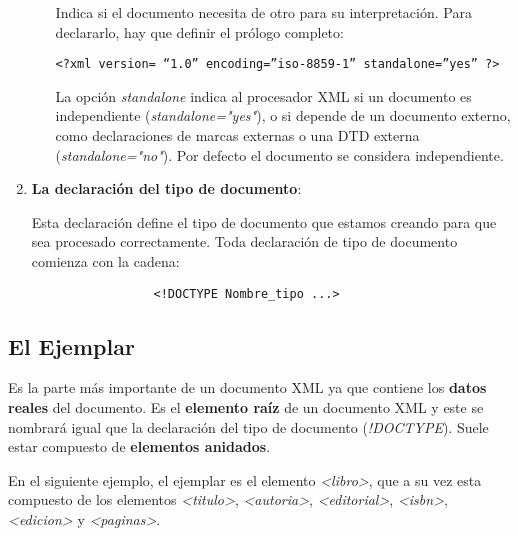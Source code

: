 \begin{enumerate}
\begin{enumerate}
         Indica si el documento necesita de otro para su interpretación. Para declararlo, hay que definir el prólogo completo:
         \begin{tcolorbox}[sharp corners, colback=yellow!40, colframe=white!20]
             \small
             \begin{verbatim}<?xml version= “1.0” encoding=”iso-8859-1” standalone=”yes” ?>\end{verbatim}
         \end{tcolorbox}

         La opción \textit{standalone} indica al procesador XML si un documento es independiente (\textit{standalone="yes"}), o si depende de un documento externo, como declaraciones de marcas externas o una DTD externa (\textit{standalone="no"}). Por defecto el documento se considera independiente.
    \end{enumerate}

    \item \textbf{La declaración del tipo de documento}:

    Esta declaración define el tipo de documento que estamos creando para que sea procesado correctamente. Toda declaración de tipo de documento comienza con la cadena:

    \begin{tcolorbox}[sharp corners, colback=yellow!40, colframe=white!20]
        \begin{verbatim}                 <!DOCTYPE Nombre_tipo ...>\end{verbatim}
    \end{tcolorbox}
\end{enumerate}

\subsection{El Ejemplar}
Es la parte más importante de un documento XML ya que contiene los \textbf{datos reales} del documento. Es el \textbf{elemento raíz} de un documento XML y este se nombrará igual que la declaración del tipo de documento (\textit{!DOCTYPE}). Suele estar compuesto de \textbf{elementos anidados}.

En el siguiente ejemplo, el ejemplar es el elemento \textit{<libro>}, que a su vez esta compuesto de los elementos \textit{<titulo>}, \textit{<autoria>}, \textit{<editorial>}, \textit{<isbn>}, \textit{<edicion>} y \textit{<paginas>}.

